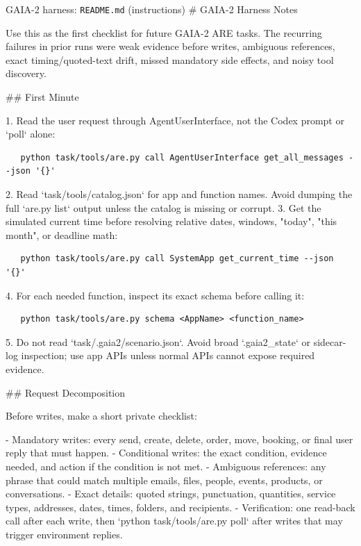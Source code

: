 \documentclass{llmxive}
\begin{document}
\begin{promptbox}{GAIA-2 harness: \texttt{README.md} (instructions)}
# GAIA-2 Harness Notes

Use this as the first checklist for future GAIA-2 ARE tasks. The recurring failures in prior runs were weak evidence before writes, ambiguous references, exact timing/quoted-text drift, missed mandatory side effects, and noisy tool discovery.

## First Minute

1. Read the user request through AgentUserInterface, not the Codex prompt or `poll` alone:

\begin{lstlisting}
   python task/tools/are.py call AgentUserInterface get_all_messages --json '{}'
\end{lstlisting}

2. Read `task/tools/catalog.json` for app and function names. Avoid dumping the full `are.py list` output unless the catalog is missing or corrupt.
3. Get the simulated current time before resolving relative dates, windows, "today", "this month", or deadline math:

\begin{lstlisting}
   python task/tools/are.py call SystemApp get_current_time --json '{}'
\end{lstlisting}

4. For each needed function, inspect its exact schema before calling it:

\begin{lstlisting}
   python task/tools/are.py schema <AppName> <function_name>
\end{lstlisting}

5. Do not read `task/.gaia2/scenario.json`. Avoid broad `.gaia2_state` or sidecar-log inspection; use app APIs unless normal APIs cannot expose required evidence.

## Request Decomposition

Before writes, make a short private checklist:

- Mandatory writes: every send, create, delete, order, move, booking, or final user reply that must happen.
- Conditional writes: the exact condition, evidence needed, and action if the condition is not met.
- Ambiguous references: any phrase that could match multiple emails, files, people, events, products, or conversations.
- Exact details: quoted strings, punctuation, quantities, service types, addresses, dates, times, folders, and recipients.
- Verification: one read-back call after each write, then `python task/tools/are.py poll` after writes that may trigger environment replies.


\end{promptbox}
\end{document}
